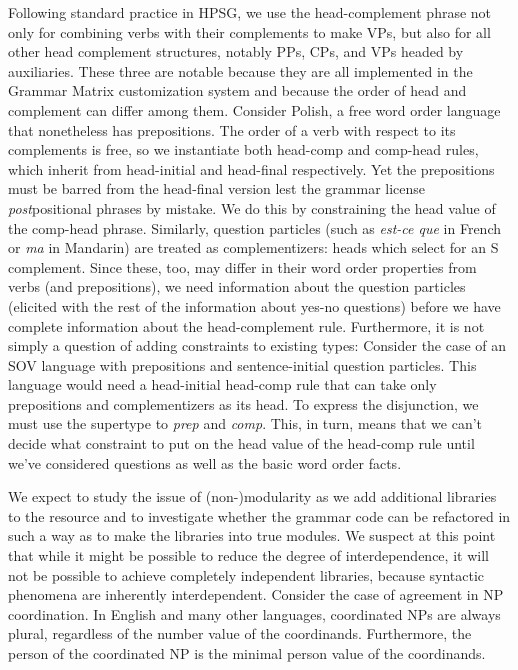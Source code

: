 \documentclass[11pt]{article}
\begin{document}
Following standard practice in HPSG, we use the head-complement phrase
not only for combining verbs with their complements to make VPs, but
also for all other head complement structures, notably PPs, CPs, and
VPs headed by auxiliaries.  These three are notable because they are
all implemented in the Grammar Matrix customization system and
because the order of head and complement can differ among them.
Consider Polish, a free word order language that nonetheless has
prepositions.  The order of a verb with respect to its complements is
free, so we instantiate both head-comp and comp-head rules, which
inherit from head-initial and head-final respectively. Yet the
prepositions must be barred from the head-final version lest the
grammar license {\it post}positional phrases by mistake. We do this by
constraining the {\sc head} value of the comp-head phrase.  Similarly,
question particles (such as {\it est-ce que} in French or {\it ma} in
Mandarin) are treated as complementizers: heads which select for an S
complement.  Since these, too, may differ in their word order
properties from verbs (and prepositions), we need information about
the question particles (elicited with the rest of the information
about yes-no questions) before we have complete information about the
head-complement rule.  Furthermore, it is not simply a question of
adding constraints to existing types: Consider the case of an SOV
language with prepositions and sentence-initial question particles.
This language would need a head-initial head-comp rule that can take
only prepositions and complementizers as its head.  To express the
disjunction, we must use the supertype to {\it prep} and {\it
comp}.  This, in turn, means that we can't decide what constraint to
put on the head value of the head-comp rule until we've considered
questions as well as the basic word order facts.

We expect to study the issue of (non-)modularity as we add additional
libraries to the resource and to investigate whether the grammar code
can be refactored in such a way as to make the libraries into true
modules.  We suspect at this point that while it might be possible to
reduce the degree of interdependence, it will not be possible to
achieve completely independent libraries, because syntactic phenomena
are inherently interdependent. Consider the case of
agreement in NP coordination. In English and many other languages, 
coordinated NPs are always plural, regardless of the number value of the
coordinands.  Furthermore, the person of the coordinated NP is the
minimal person value of the coordinands.  
\end{document}
